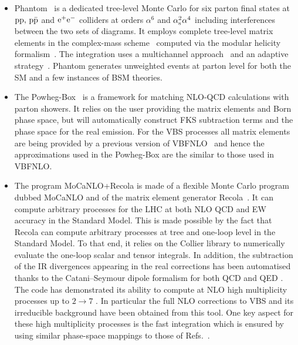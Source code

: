 \begin{itemize}
  \item {\sc Phantom}~\cite{Ballestrero:2007xq} is a dedicated tree-level Monte Carlo for six parton final states 
  at $\text{p} \text{p},\, \text{p}\bar{\text{p}}$ and $\text{e}^+\text{e}^-$ colliders at orders $\alpha^6$ and $\alpha_\text{s}^2\alpha^4$ including interferences between the two sets of diagrams.
It employs complete tree-level matrix elements in the complex-mass scheme~\cite{Denner:2006ic} computed via the modular helicity formalism~\cite{Ballestrero:1999md,Ballestrero:1994jn}.
The integration uses a multichannel approach~\cite{Berends:1984gf} and an adaptive strategy~\cite{Lepage:1977sw}.
{\sc Phantom} generates unweighted events at parton level for both the SM and a few instances of BSM theories.

  \item The {\sc Powheg-Box}~\cite{Alioli:2010xd,Frixione:2007vw} is a framework for matching NLO-QCD calculations with parton showers.
It relies on the user providing the matrix elements and Born phase space, but will automatically construct FKS \cite{Frixione:1995ms} subtraction terms and the phase space for the real emission.
For the VBS processes all matrix elements are being provided by a previous version of {\sc VBFNLO}~\cite{Arnold:2008rz, Arnold:2011wj, Baglio:2014uba} and hence the approximations used in the {\sc Powheg-Box} are the similar to those used in {\sc VBFNLO}.

\item The program {\sc MoCaNLO+Recola} is made of a flexible Monte Carlo program dubbed {\sc MoCaNLO} and of the matrix element generator {\sc Recola}~\cite{Actis:2012qn,Actis:2016mpe}.
It can compute arbitrary processes for the LHC at both NLO QCD and EW accuracy in the Standard Model.
This is made possible by the fact that {\sc Recola} can compute arbitrary processes at tree and one-loop level in the Standard Model.
To that end, it relies on the {\sc Collier} library \cite{Denner:2014gla,Denner:2016kdg} to numerically evaluate the one-loop scalar and tensor integrals.
In addition, the subtraction of the IR divergences appearing in the real corrections has been automatised thanks to the Catani--Seymour dipole formalism for both QCD and QED \cite{Catani:1996vz,Dittmaier:1999mb}.
The code has demonstrated its ability to compute at NLO high multiplicity processes up to $2 \to 7$ \cite{Denner:2015yca,Denner:2016wet}.
In particular the full NLO corrections to VBS and its irreducible background \cite{Biedermann:2016yds,Biedermann:2017bss} have been obtained from this tool.
One key aspect for these high multiplicity processes is the fast integration which is ensured by using similar phase-space mappings to those of Refs.~\cite{Berends:1994pv,Denner:1999gp,Dittmaier:2002ap}.


\end{itemize}
